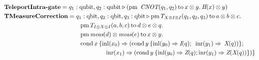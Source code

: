 \begin{align*}
      \hspace{-28pt}
      &\textbf{TeleportIntra-gate} =  q_{1}: \text{qubit}, q_{2}: \text{qubit}  \triangleright  (\text{pm}  \hspace{5pt} \textit{CNOT} (q_{1},q_{2})  \hspace{2pt}  \text{to} \hspace{2pt} x \otimes y.  \hspace{2pt}  \textit{H} (x) \otimes y) \\
      &\textbf{TMeasureCorrection}= q_{1}: \text{qbit}, q_{2}: \text{qbit},  q_{3}: \text{qbit} \triangleright \text{pm} \hspace{2pt} T_{X \otimes I \otimes I} (q_{1},q_{2},q_{3}) \hspace{2pt} \text{to} \hspace{2pt} a \otimes b \otimes c . \hspace{2pt}   \\
      &\hspace{125pt} \text{pm} \hspace{2pt} T_{I \otimes X \otimes I} (a,b,c) \hspace{2pt} \text{to} \hspace{2pt} d \otimes e \otimes q. \\
      & \hspace{125pt} \text{pm} \hspace{2pt} \textit{meas} (d) \otimes \textit{meas} (e)  \hspace{2pt} \text{to} \hspace{2pt} x \otimes y. \hspace{2pt} \\
      &  \hspace{125pt} \text{cond}\hspace{2pt} x \hspace{2pt}  \{\text{inl} (x_{0}) \Rightarrow  (\text{cond}\hspace{2pt} y  \hspace{2pt}  \{\text{inl} (y_{0})  \Rightarrow{}  \textit{I}(q) ;  \hspace{5pt} \text{inr} (y_{1}) \Rightarrow  \hspace{2pt}   \textit{X} (q)) \}; \\
      & \hspace{167pt}\text{inr} (x_{1})  \Rightarrow  (\text{cond}\hspace{2pt} y  \hspace{2pt}  \{\text{inl} (y_{0})  \Rightarrow   \textit{Z}(q); \text{inr} (y_{1}) \Rightarrow{} \textit{Z} (\textit{X}(q)) \})\}
 \end{align*}

